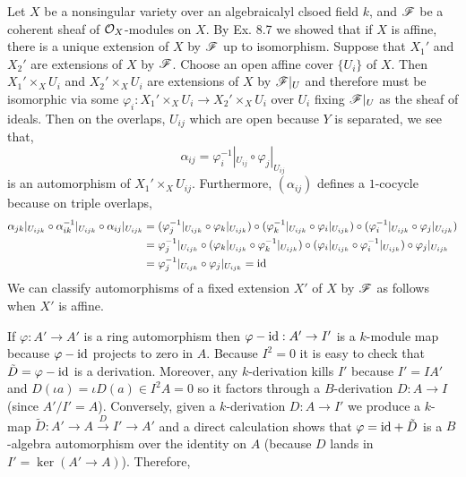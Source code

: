 \documentclass[12pt]{article}
\begin{document}
Let $X$ be a nonsingular variety over an algebraicalyl clsoed field $k$, and $\mathscr{F}$ be a coherent sheaf of $\mathcal{O}_{X}$-modules on $X$. By Ex. 8.7 we showed that if $X$ is affine, there is a unique extension of $X$ by $\mathscr{F}$ up to isomorphism. Suppose that $X_1'$ and $X_2'$ are extensions of $X$ by $\mathscr{F}$. Choose an open affine cover $\{ U_i \}$ of $X$. Then $X_1' \times_{X} U_i$ and $X_2' \times_{X} U_i$ are extensions of $X$ by $\mathscr{F}|_U$ and therefore must be isomorphic via some $\varphi_i :  X_1' \times_{X} U_i \to X_2' \times_{X} U_i$ over $U_i$ fixing $\mathscr{F}|_U$ as the sheaf of ideals. Then on the overlaps, $U_{ij}$ which are open because $Y$ is separated, we see that,
\[ \alpha_{ij} = \varphi_i^{-1} |_{U_{ij}} \circ \varphi_j|_{U_{ij}} \]
is an automorphism of $X_1' \times_{X} U_{ij}$. Furthermore, $(\alpha_{ij})$ defines a $1$-cocycle because on triple overlaps, 
\begin{align*}
\alpha_{jk} |_{U_{ijk}} \circ \alpha_{ik}^{-1} |_{U_{ijk}} \circ \alpha_{ij} |_{U_{ijk}} &= (\varphi_j^{-1} |_{U_{ijk}} \circ \varphi_k |_{U_{ijk}}) \circ (\varphi_k^{-1} |_{U_{ijk}} \circ \varphi_i |_{U_{ijk}}) \circ (\varphi_i^{-1}|_{U_{ijk}} \circ \varphi_j|_{U_{ijk}})
\\
& = \varphi_j^{-1} |_{U_{ijk}} \circ (\varphi_k |_{U_{ijk}} \circ \varphi_k^{-1} |_{U_{ijk}}) \circ (\varphi_i |_{U_{ijk}} \circ \varphi_i^{-1}|_{U_{ijk}}) \circ \varphi_j|_{U_{ijk}}
\\
& = \varphi_j^{-1} |_{U_{ijk}} \circ \varphi_j|_{U_{ijk}} = \mathrm{id}
\end{align*}
We can classify automorphisms of a fixed extension $X'$ of $X$ by $\mathscr{F}$ as follows when $X'$ is affine.
\begin{center}
\end{center}
If $\varphi : A' \to A'$ is a ring automorphism then $\varphi - \mathrm{id} : A' \to I'$ is a $k$-module map because $\varphi - \mathrm{id}$ projects to zero in $A$. Because $I^2 = 0$ it is easy to check that $\tilde{D} = \varphi - \mathrm{id}$ is a derivation. Moreover, any $k$-derivation kills $I'$ because $I' = IA'$ and $D(\iota a) = \iota D(a) \in I^2 A = 0$ so it factors through a $B$-derivation $D : A \to I$ (since $A'/I' = A$). Conversely, given a $k$-derivation $D : A \to I'$ we produce a $k$-map $\tilde{D} : A' \to A \xrightarrow{D} I' \to A'$ and a direct calculation shows that $\varphi = \mathrm{id} + \tilde{D}$ is a $B$-algebra automorphism over the identity on $A$ (because $D$ lands in $I' = \ker{(A' \to A)}$). Therefore,
\end{document}
